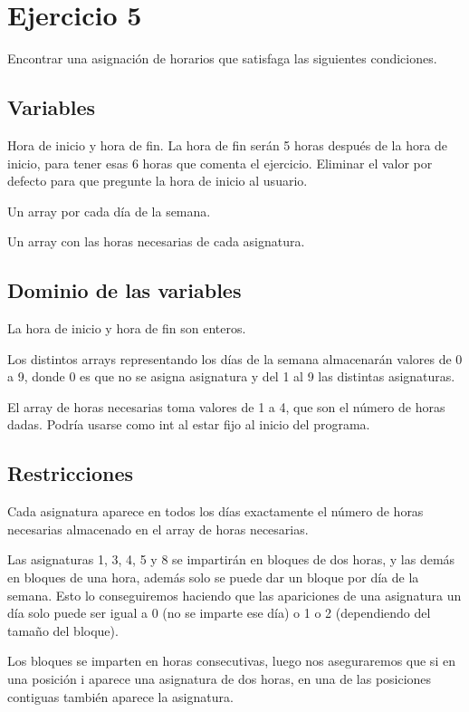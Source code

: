 \documentclass[11pt, spanish]{article}
\begin{document}
\section{Ejercicio 5}

Encontrar una asignación de horarios que satisfaga las siguientes condiciones.

\subsection{Variables}

Hora de inicio y hora de fin. La hora de fin serán 5 horas después de la hora de inicio, para tener esas 6 horas que comenta el ejercicio. Eliminar el valor por defecto para que pregunte la hora de inicio al usuario.

Un array por cada día de la semana.

Un array con las horas necesarias de cada asignatura.

\subsection{Dominio de las variables}

La hora de inicio y hora de fin son enteros.

Los distintos arrays representando los días de la semana almacenarán valores de 0 a 9, donde 0 es que no se asigna asignatura y del 1 al 9 las distintas asignaturas.

El array de horas necesarias toma valores de 1 a 4, que son el número de horas dadas. Podría usarse como int al estar fijo al inicio del programa.

\subsection{Restricciones}

Cada asignatura aparece en todos los días exactamente el número de horas necesarias almacenado en el array de horas necesarias.

Las asignaturas 1, 3, 4, 5 y 8 se impartirán en bloques de dos horas, y las demás en bloques de una hora, además solo se puede dar un bloque por día de la semana. Esto lo conseguiremos haciendo que las apariciones de una asignatura un día solo puede ser igual a  0 (no se imparte ese día) o 1 o 2 (dependiendo del tamaño del bloque).

Los bloques se imparten en horas consecutivas, luego nos aseguraremos que si en una posición i aparece una asignatura de dos horas, en una de las posiciones contiguas también aparece la asignatura.
\end{document}

